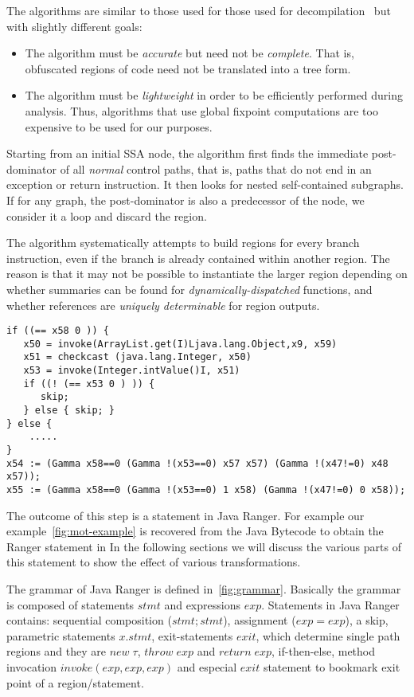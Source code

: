 The algorithms are similar to those used for those used for decompilation~\cite{Yakdan15@decompilation} but with slightly different goals: 
\begin{itemize}
    \item The algorithm must be {\em accurate} but need not be {\em complete}.  That is, obfuscated regions of code need not be translated into a tree form.
    \item The algorithm must be {\em lightweight} in order to be efficiently performed during analysis.  Thus, algorithms that use global fixpoint computations are 
        too expensive to be used for our purposes.
\end{itemize}

Starting from an initial SSA node, the algorithm first finds the immediate post-dominator of all {\em normal} control paths, that is, paths that do not end in an exception or return instruction.  It then looks for nested self-contained subgraphs.  If for any graph, the post-dominator is also a predecessor of the node, we consider it a loop and discard the region.  

The algorithm systematically attempts to build regions for every branch instruction, even if the branch is already contained within another region.  The reason is that it may not be possible to instantiate the larger region depending on whether summaries can be found for {\em dynamically-dispatched} functions, and whether references are {\em uniquely determinable} for region outputs.

\begin{lstlisting}
if ((== x58 0 )) {
   x50 = invoke(ArrayList.get(I)Ljava.lang.Object,x9, x59)
   x51 = checkcast (java.lang.Integer, x50)
   x53 = invoke(Integer.intValue()I, x51)
   if ((! (== x53 0 ) )) {
      skip;
   } else { skip; }
} else {
	.....
}
x54 := (Gamma x58==0 (Gamma !(x53==0) x57 x57) (Gamma !(x47!=0) x48 x57));
x55 := (Gamma x58==0 (Gamma !(x53==0) 1 x58) (Gamma !(x47!=0) 0 x58));
\end{lstlisting}
The outcome of this step is a statement in Java Ranger. For example our example~\ref{fig:mot-example} is recovered from the Java Bytecode to obtain the Ranger statement in
In the following sections we will discuss the various parts of this statement to show the effect of various transformations. 

The grammar of Java Ranger is defined in~\ref{fig:grammar}. Basically the grammar is composed of statements $stmt$ and expressions $exp$. Statements in Java Ranger contains: sequential composition ($stmt;stmt$), assignment ($exp = exp$), a skip, parametric statements $x.stmt$, exit-statements $exit$, which determine single path regions and they are $new\; \tau$, $throw\; exp$ and $return\; exp$, if-then-else, method invocation $invoke(exp, exp, exp)$ and especial $exit$ statement to bookmark exit point of a region/statement. 

